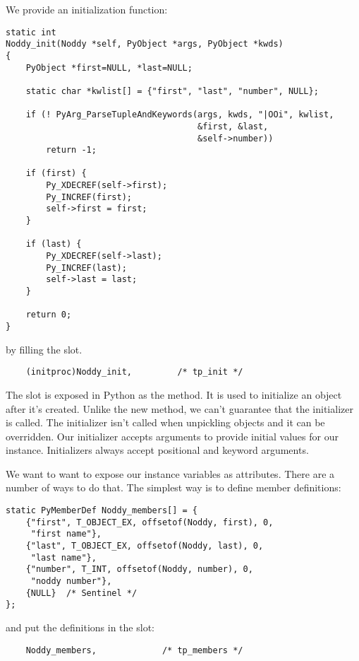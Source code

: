 We provide an initialization function:

\begin{verbatim}
static int
Noddy_init(Noddy *self, PyObject *args, PyObject *kwds)
{
    PyObject *first=NULL, *last=NULL;

    static char *kwlist[] = {"first", "last", "number", NULL};

    if (! PyArg_ParseTupleAndKeywords(args, kwds, "|OOi", kwlist, 
                                      &first, &last, 
                                      &self->number))
        return -1; 

    if (first) {
        Py_XDECREF(self->first);
        Py_INCREF(first);
        self->first = first;
    }

    if (last) {
        Py_XDECREF(self->last);
        Py_INCREF(last);
        self->last = last;
    }

    return 0;
}
\end{verbatim}

by filling the  slot.

\begin{verbatim}
    (initproc)Noddy_init,         /* tp_init */
\end{verbatim}

The  slot is exposed in Python as the
 method. It is used to initialize an object after
it's created. Unlike the new method, we can't guarantee that the
initializer is called.  The initializer isn't called when unpickling
objects and it can be overridden.  Our initializer accepts arguments
to provide initial values for our instance. Initializers always accept
positional and keyword arguments.

We want to want to expose our instance variables as attributes. There
are a number of ways to do that. The simplest way is to define member
definitions:

\begin{verbatim}
static PyMemberDef Noddy_members[] = {
    {"first", T_OBJECT_EX, offsetof(Noddy, first), 0,
     "first name"},
    {"last", T_OBJECT_EX, offsetof(Noddy, last), 0,
     "last name"},
    {"number", T_INT, offsetof(Noddy, number), 0,
     "noddy number"},
    {NULL}  /* Sentinel */
};
\end{verbatim}

and put the definitions in the  slot:

\begin{verbatim}
    Noddy_members,             /* tp_members */
\end{verbatim}

